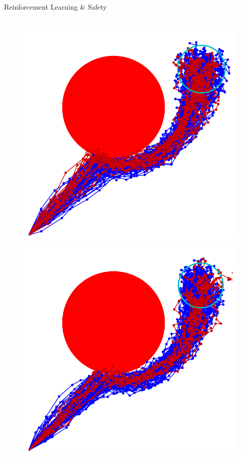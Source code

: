 \documentclass[lecture]{beamer}
\begin{document}
\begin{frame}{\normalsize Reinforcement Learning \& Safety}
\begin{columns}
\begin{overlayarea}{\textwidth}{.55\textheight}
\begin{figure}
{	}
	      \only<7>
        {
        \center
	\includegraphics[width=1\textwidth,clip]{Codes/RL/RLSafety4.pdf}
	}
	      \only<8>
        {
        \center
	\includegraphics[width=1\textwidth,clip]{Codes/RL/RLSafety5.pdf}
}
\end{figure}
\end{overlayarea}
\end{columns}
\end{frame}
\end{document}
